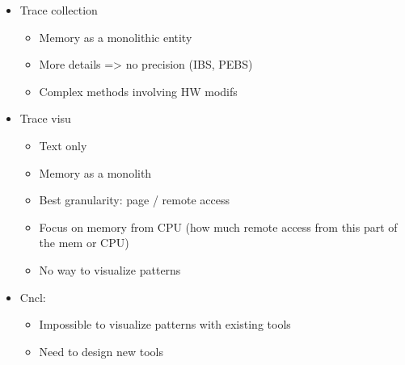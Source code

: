\begin{itemize}
    \item Trace collection
        \begin{itemize}
            \item Memory as a monolithic entity
            \item More details => no precision (IBS, PEBS)
            \item Complex methods involving HW modifs
        \end{itemize}
    \item Trace visu
        \begin{itemize}
            \item Text only
            \item Memory as a monolith
            \item Best granularity: page / remote access
            \item Focus on memory from CPU (how much remote access from this part of the mem or CPU)
            \item No way to visualize patterns
        \end{itemize}
    \item Cncl:
        \begin{itemize}
            \item Impossible to visualize patterns with existing tools
            \item Need to design new tools
        \end{itemize}
\end{itemize}

